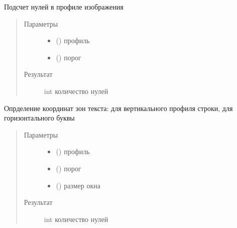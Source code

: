 \documentclass[letterpaper,10pt,russian]{sphinxmanual}
\begin{document}
\begin{fulllineitems}
\label{\detokenize{TextProfiler:TextProfiler.find_zero}}
Подсчет нулей в профиле изображения
\begin{quote}\begin{description}
\item[{Параметры}] \leavevmode\begin{itemize}
\item {} 
 () \textendash{} профиль

\item {} 
 () \textendash{} порог

\end{itemize}

\item[{Результат}] \leavevmode
int \textendash{} количество нулей

\end{description}\end{quote}

\end{fulllineitems}


\begin{fulllineitems}
\label{\detokenize{TextProfiler:TextProfiler.get_zones}}
Опрделение координат зон текста: для вертикального профиля \sphinxhyphen{} строки, для горизонтального \sphinxhyphen{} буквы
\begin{quote}\begin{description}
\item[{Параметры}] \leavevmode\begin{itemize}
\item {} 
 () \textendash{} профиль

\item {} 
 () \textendash{} порог

\item {} 
 () \textendash{} размер окна

\end{itemize}

\item[{Результат}] \leavevmode
int \textendash{} количество нулей

\end{description}\end{quote}

\end{fulllineitems}
\end{document}
